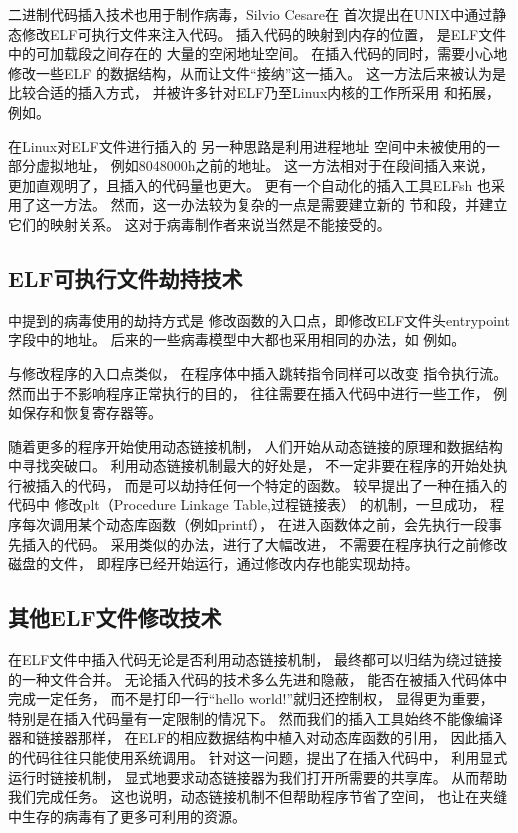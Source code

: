 二进制代码插入技术也用于制作病毒，Silvio Cesare在\cite{silvio}
首次提出在UNIX中通过静态修改ELF可执行文件来注入代码。
插入代码的映射到内存的位置，
是ELF文件中的可加载段之间存在的
大量的空闲地址空间。
在插入代码的同时，需要小心地修改一些ELF
的数据结构，从而让文件“接纳”这一插入。
这一方法后来被认为是比较合适的插入方式，
并被许多针对ELF乃至Linux内核的工作所采用
和拓展，
例如\cite{simple,prototype,subversive,cerberus,sharelib}。


在Linux对ELF文件进行插入的
另一种思路是利用进程地址
空间中未被使用的一部分虚拟地址，
例如8048000h之前的地址。
这一方法相对于在段间插入来说，
更加直观明了，且插入的代码量也更大。
更有一个自动化的插入工具ELFsh
也采用了这一方法。
然而，这一办法较为复杂的一点是需要建立新的
节和段，并建立它们的映射关系。
这对于病毒制作者来说当然是不能接受的。

\subsection{ELF可执行文件劫持技术}

\cite{silvio}中提到的病毒使用的劫持方式是
修改函数的入口点，即修改ELF文件头entrypoint字段中的地址。
后来的一些病毒模型中大都也采用相同的办法，如
例如\cite{simple,prototype}。

与修改程序的入口点类似，
在程序体中插入跳转指令同样可以改变
指令执行流。然而出于不影响程序正常执行的目的，
往往需要在插入代码中进行一些工作，
例如保存和恢复寄存器等。

随着更多的程序开始使用动态链接机制，
人们开始从动态链接的原理和数据结构中寻找突破口。
利用动态链接机制最大的好处是，
不一定非要在程序的开始处执行被插入的代码，
而是可以劫持任何一个特定的函数。
\cite{sharelib}较早提出了一种在插入的代码中
修改plt（Procedure Linkage Table,过程链接表）
的机制，一旦成功，
程序每次调用某个动态库函数（例如printf），
在进入函数体之前，会先执行一段事先插入的代码。
采用类似的办法，\cite{modern}进行了大幅改进，
不需要在程序执行之前修改磁盘的文件，
即程序已经开始运行，通过修改内存也能实现劫持。


\subsection{其他ELF文件修改技术}
在ELF文件中插入代码无论是否利用动态链接机制，
最终都可以归结为绕过链接的一种文件合并。
无论插入代码的技术多么先进和隐蔽，
能否在被插入代码体中完成一定任务，
而不是打印一行“hello world!”就归还控制权，
显得更为重要，
特别是在插入代码量有一定限制的情况下。
然而我们的插入工具始终不能像编译器和链接器那样，
在ELF的相应数据结构中植入对动态库函数的引用，
因此插入的代码往往只能使用系统调用。
针对这一问题，\cite{subversive}提出了在插入代码中，
利用显式运行时链接机制，
显式地要求动态链接器为我们打开所需要的共享库。
从而帮助我们完成任务。
这也说明，动态链接机制不但帮助程序节省了空间，
也让在夹缝中生存的病毒有了更多可利用的资源。

